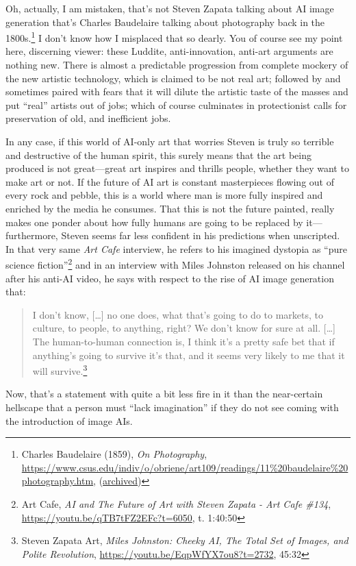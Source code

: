 \documentclass[11pt]{article}
\begin{document}
Oh, actually, I am mistaken, that's not Steven Zapata talking about AI image generation that's Charles Baudelaire talking about photography back in the 1800s.\footnote{Charles Baudelaire (1859), \emph{On Photography}, \url{https://www.csus.edu/indiv/o/obriene/art109/readings/11\%20baudelaire\%20photography.htm}, (\href{https://archive.ph/36k1O}{archived})} I don't know how I misplaced that so dearly. You of course see my point here, discerning viewer: these Luddite, anti-innovation, anti-art arguments are nothing new. There is almost a predictable progression from complete mockery of the new artistic technology, which is claimed to be not real art; followed by and sometimes paired with fears that it will dilute the artistic taste of the masses and put ``real'' artists out of jobs; which of course culminates in protectionist calls for preservation of old, and inefficient jobs.

In any case, if this world of AI-only art that worries Steven is truly so terrible and destructive of the human spirit, this surely means that the art being produced is not great---great art inspires and thrills people, whether they want to make art or not. If the future of AI art is constant masterpieces flowing out of every rock and pebble, this is a world where man is more fully inspired and enriched by the media he consumes. That this is not the future painted, really makes one ponder about how fully humans are going to be replaced by it---furthermore, Steven seems far less confident in his predictions when unscripted. In that very same \emph{Art Cafe} interview, he refers to his imagined dystopia as ``pure science fiction''\footnote{Art Cafe, \emph{AI and The Future of Art with Steven Zapata - Art Cafe \#134}, \url{https://youtu.be/qTB7tFZ2EFc?t=6050}, t. 1:40:50} and in an interview with Miles Johnston released on his channel after his anti-AI video, he says with respect to the rise of AI image generation that:
\begin{quote}
I don't know, [\ldots{}] no one does, what that's going to do to markets, to culture, to people, to anything, right? We don't know for sure at all. [\ldots{}] The human-to-human connection is, I think it's a pretty safe bet that if anything's going to survive it's that, and it seems very likely to me that it will survive.\footnote{Steven Zapata Art, \emph{Miles Johnston: Cheeky AI, The Total Set of Images, and Polite Revolution}, \url{https://youtu.be/EqpWfYX7ou8?t=2732}, 45:32}
\end{quote}

Now, that's a statement with quite a bit less fire in it than the near-certain hellscape that a person must ``lack imagination'' if they do not see coming with the introduction of image AIs.
\end{document}

